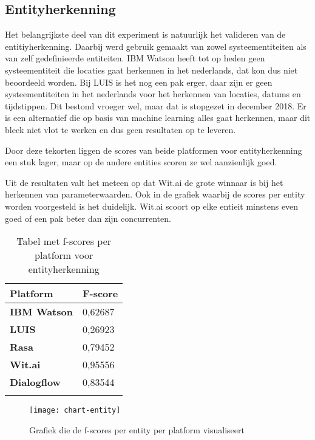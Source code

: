 \subsection{Entityherkenning}

Het belangrijkste deel van dit experiment is natuurlijk het valideren van de entitiyherkenning. Daarbij werd gebruik gemaakt van zowel systeementiteiten als van zelf gedefinieerde entiteiten. IBM Watson heeft tot op heden geen systeementiteit die locaties gaat herkennen in het nederlands, dat kon dus niet beoordeeld worden. Bij LUIS is het nog een pak erger, daar zijn er geen systeementiteiten in het nederlands voor het herkennen van locaties, datums en tijdstippen. Dit bestond vroeger wel, maar dat is stopgezet in december 2018. Er is een alternatief die op basis van machine learning alles gaat herkennen, maar dit bleek niet vlot te werken en dus geen resultaten op te leveren.

Door deze tekorten liggen de scores van beide platformen voor entityherkenning een stuk lager, maar op de andere entities scoren ze wel aanzienlijk goed. 

Uit de resultaten valt het meteen op dat Wit.ai de grote winnaar is bij het herkennen van parameterwaarden. Ook in de grafiek waarbij de scores per entity worden voorgesteld is het duidelijk. Wit.ai scoort op elke entieit minstens even goed of een pak beter dan zijn concurrenten.

\begin{center}
    \begin{longtable}{| l | l |}
        \hline
        \textbf{Platform} & \textbf{F-score} \\ \hline
        \textbf{IBM Watson} & 0,62687 \\ \hline  
        \textbf{LUIS} & 0,26923 \\ \hline  
        \textbf{Rasa} & 0,79452 \\ \hline  
        \textbf{Wit.ai} & 0,95556  \\ \hline  
        \textbf{Dialogflow} & 0,83544 \\ \hline  
        \caption{Tabel met f-scores per platform voor entityherkenning}                                    
    \end{longtable}
    \label{tbl:results-entity}
\end{center}

\begin{figure}[H]
    \label{fig:chart-entity}
    \centering
    \texttt{[image: chart-entity]}
    \caption{Grafiek die de f-scores per entity per platform visualiseert}
\end{figure}

